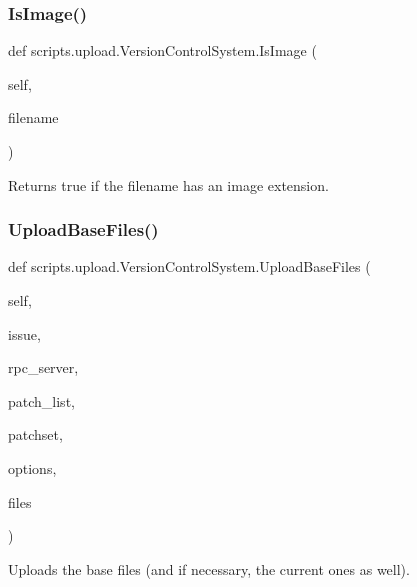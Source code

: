 \mbox{\label{classscripts_1_1upload_1_1_version_control_system_a72f3cbed49e955ae7f89496302ec4b9f}} 
\subsubsection{\texorpdfstring{IsImage()}{IsImage()}}
{\footnotesize\ttfamily def scripts.\+upload.\+Version\+Control\+System.\+Is\+Image (\begin{DoxyParamCaption}\item[{}]{self,  }\item[{}]{filename }\end{DoxyParamCaption})}

\begin{DoxyVerb}Returns true if the filename has an image extension.\end{DoxyVerb}
 \mbox{\label{classscripts_1_1upload_1_1_version_control_system_a51e1062c1bcc11b77c9819e63c158901}} 
\subsubsection{\texorpdfstring{UploadBaseFiles()}{UploadBaseFiles()}}
{\footnotesize\ttfamily def scripts.\+upload.\+Version\+Control\+System.\+Upload\+Base\+Files (\begin{DoxyParamCaption}\item[{}]{self,  }\item[{}]{issue,  }\item[{}]{rpc\+\_\+server,  }\item[{}]{patch\+\_\+list,  }\item[{}]{patchset,  }\item[{}]{options,  }\item[{}]{files }\end{DoxyParamCaption})}

\begin{DoxyVerb}Uploads the base files (and if necessary, the current ones as well).\end{DoxyVerb}
 

